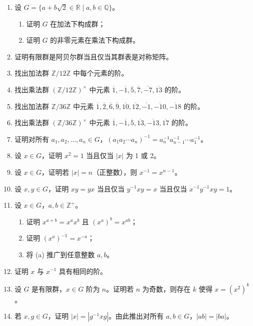 \begin{enumerate}
\begin{enumerate}
\end{enumerate}
\item 设 \(G = \{a + b\sqrt{2} \in \mathbb{R} \mid a, b \in \mathbb{Q}\}\)。
\begin{enumerate}
\item 证明 \(G\) 在加法下构成群；
\item 证明 \(G\) 的非零元素在乘法下构成群。
\end{enumerate}
\item 证明有限群是阿贝尔群当且仅当其群表是对称矩阵。
\item 找出加法群 \(\mathbb{Z}/12\mathbb{Z}\) 中每个元素的阶。
\item 找出乘法群 \((\mathbb{Z}/12\mathbb{Z})^{\times}\) 中元素 \(\overline{1}, -\overline{1}, \overline{5},\overline{7}, \overline{-7}, \overline{13}\) 的阶。
\item 找出加法群 \(\mathbb{Z}/36\mathbb{Z}\) 中元素 \(\overline{1}, \overline{2}, \overline{6}, \overline{9}, \overline{10}, \overline{12}, \overline{-1}, \overline{-10},\overline{-18}\) 的阶。
\item 找出乘法群 \((\mathbb{Z}/36\mathbb{Z})^{\times}\) 中元素 \(\overline{1}, -\overline{1}, \overline{5}, \overline{13}, \overline{-13}, \overline{17}\) 的阶。
\item 证明对所有 \(a_1, a_2, \ldots, a_n \in G\)，\((a_1 a_2 \cdots a_n)^{-1} = a_n^{-1} a_{n-1}^{-1} \cdots a_1^{-1}\)。
\item 设 \(x \in G\)，证明 \(x^2 = 1\) 当且仅当 \(|x|\) 为 1 或 2。
\item 设 \(x \in G\)，证明若 \(|x| = n\)（正整数），则 \(x^{-1} = x^{n-1}\)。
\item 设 \(x, y \in G\)，证明 \(xy = yx\) 当且仅当 \(y^{-1}xy = x\) 当且仅当 \(x^{-1}y^{-1}xy = 1\)。
\item 设 \(x \in G\)，\(a, b \in \mathbb{Z}^+\)。
\begin{enumerate}
\item 证明 \(x^{a+b} = x^a x^b\) 且 \((x^a)^b = x^{ab}\)；
\item 证明 \((x^a)^{-1} = x^{-a}\)；
\item 将 (a) 推广到任意整数 \(a, b\)。
\end{enumerate}
\item 证明 \(x\) 与 \(x^{-1}\) 具有相同的阶。
\item 设 \(G\) 是有限群，\(x \in G\) 阶为 \(n\)。证明若 \(n\) 为奇数，则存在 \(k\) 使得 \(x = (x^2)^k\)。
\item 若 \(x, g \in G\)，证明 \(|x| = |g^{-1}xg|\)。由此推出对所有 \(a, b \in G\)，\(|ab| = |ba|\)。

\end{enumerate}
